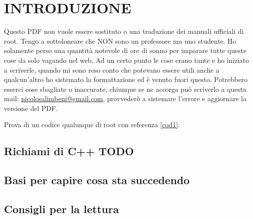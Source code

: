 \chapter{INTRODUZIONE}
Questo PDF non vuole essere sostituto o una traduzione dei manuali ufficiali di root. Tengo a sottoloneare che NON sono un professore ma uno studente. Ho solamente perso una quantità notevole di ore di sonno per imparare tutte queste cose da solo vagando nel web. Ad un certo punto le cose erano tante e ho iniziato a scriverle, quando mi sono reso conto che potevano essere utili anche a qualcun'altro ho sistemato la formattazione ed è venuto fuori questo. Potrebbero esserci cose sbagliate o inaccurate, chiunque se ne accorga può scriverlo a questa mail: \url{nicolosalimbeni@gmail.com}, provvederò a sistemare l'errore e aggiornare la versione del PDF. 

Prova di un codice qualunque di root con referenza \ref{cod1}:\\



\section{Richiami di C++ TODO}


\section{Basi per capire cosa sta succedendo}

\section{Consigli per la lettura}